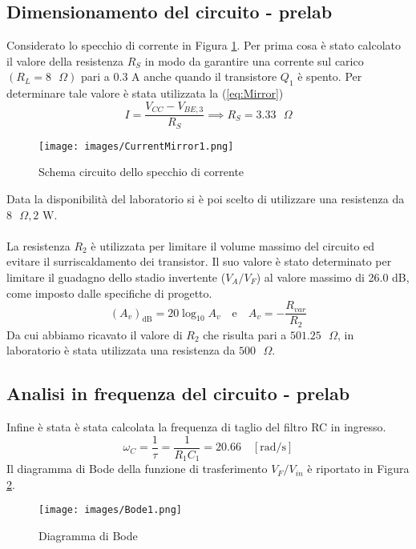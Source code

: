 \subsection{Dimensionamento del circuito - prelab}\label{ch:Prelab1}
Considerato lo specchio di corrente in Figura \ref{fig:CurrentMirror1}. Per prima cosa è stato calcolato il valore della resistenza $R_S$ in modo da garantire una corrente sul carico $(R_L=8\text{ }\Omega)$ pari a $0.3\text{ A}$ anche quando il transistore $Q_1$ è spento. Per determinare tale valore è stata utilizzata la (\ref{eq:Mirror})
\begin{equation}\label{eq:Mirror}
    I=\frac{V_{CC}-V_{BE,3}}{R_S}\implies R_S=3.33\text{ }\Omega
\end{equation}
\begin{figure}[H]
    \centering
    \texttt{[image: images/CurrentMirror1.png]}
    \caption{Schema circuito dello specchio di corrente}
    \label{fig:CurrentMirror1}
\end{figure}
\noindent Data la disponibilità del laboratorio si è poi scelto di utilizzare una resistenza da $8\text{ }\Omega,2\text{ W}$.\\\\
La resistenza $R_2$ è utilizzata per limitare il volume massimo del circuito ed evitare il surriscaldamento dei transistor. Il suo valore è stato determinato per limitare il guadagno dello stadio invertente ($V_A/V_F$) al valore massimo di 26.0 dB, come imposto dalle specifiche di progetto.
\begin{equation}
    (A_v)_{\text{dB}} = 20\log_{10}{A_v}\quad\text{e}\quad A_v = -\frac{R_{var}}{R_2}
\end{equation}
Da cui abbiamo ricavato il valore di $R_2$ che risulta pari a $501.25\text{ }\Omega$, in laboratorio è stata utilizzata una resistenza da $500\text{ }\Omega$.
\subsection{Analisi in frequenza del circuito - prelab}
Infine è stata è stata calcolata la frequenza di taglio del filtro RC in ingresso.
\begin{equation}
    \omega_C=\frac{1}{\tau}=\frac{1}{R_1C_1}=20.66\quad[\text{rad/s}]
\end{equation}
Il diagramma di Bode della funzione di trasferimento $V_F/V_{in}$ è riportato in Figura \ref{fig:Bode1}.
\begin{figure}[H]
    \centering
    \texttt{[image: images/Bode1.png]}
    \caption{Diagramma di Bode}
    \label{fig:Bode1}
\end{figure}
